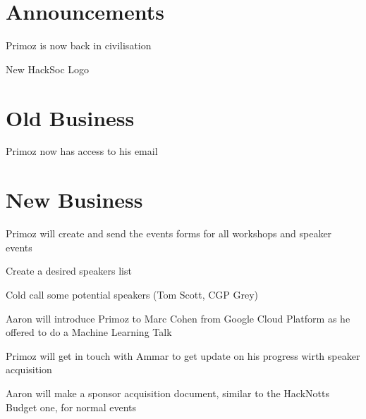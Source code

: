 \documentclass[11pt,hacksoc]{meetingmins}
\begin{document}
\maketitle

\section{Announcements}
\begin{items}
	\item
	Primoz is now back in civilisation
	
	\item
	New HackSoc Logo

\end{items}

\section{Old Business}
\begin{items}
	\item
	Primoz now has access to his email
\end{items}

\section{New Business}
\begin{items}
	\item
	Primoz will create and send the events forms for all workshops and speaker events
	
	\item
	Create a desired speakers list
	
	\item
	Cold call some potential speakers (Tom Scott, CGP Grey)
	
	\item
	Aaron will introduce Primoz to Marc Cohen from Google Cloud Platform as he offered to do a Machine Learning Talk
	
	\item
	Primoz will get in touch with Ammar to get update on his progress wirth speaker acquisition
	
	\item
	Aaron will make a sponsor acquisition document, similar to the HackNotts Budget one, for normal events
	
\end{items}

\vspace{1em}
\nextmeeting{}
\end{document}
